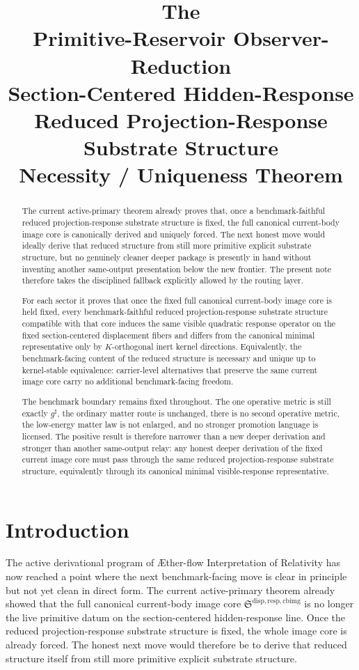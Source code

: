 \documentclass[11pt]{article}
\title{\textbf{The \TheoryName{}}\\[0.4em]
\large Primitive-Reservoir Observer-Reduction\\
\large Section-Centered Hidden-Response\\
\large Reduced Projection-Response Substrate Structure\\
\large Necessity / Uniqueness Theorem}
\author{}
\date{}
\newcommand{\Aflow}{\AE{}ther-flow}
\newcommand{\TheoryName}{\Aflow{} Interpretation of Relativity}
\newcommand{\CompletedMetric}{g^{\sharp}}
\newcommand{\CurrentBodyImageCore}{\mathfrak S^{\mathrm{disp,resp,cbimg}}}
\begin{document}
\maketitle

\begin{abstract}
The current active-primary theorem already proves that, once a benchmark-faithful reduced projection-response substrate structure is fixed, the full canonical current-body image core is canonically derived and uniquely forced. The next honest move would ideally derive that reduced structure from still more primitive explicit substrate structure, but no genuinely cleaner deeper package is presently in hand without inventing another same-output presentation below the new frontier. The present note therefore takes the disciplined fallback explicitly allowed by the routing layer.

For each sector it proves that once the fixed full canonical current-body image core is held fixed, every benchmark-faithful reduced projection-response substrate structure compatible with that core induces the same visible quadratic response operator on the fixed section-centered displacement fibers and differs from the canonical minimal representative only by \(K\)-orthogonal inert kernel directions. Equivalently, the benchmark-facing content of the reduced structure is necessary and unique up to kernel-stable equivalence: carrier-level alternatives that preserve the same current image core carry no additional benchmark-facing freedom.

The benchmark boundary remains fixed throughout. The one operative metric is still exactly \(\CompletedMetric\), the ordinary matter route is unchanged, there is no second operative metric, the low-energy matter law is not enlarged, and no stronger promotion language is licensed. The positive result is therefore narrower than a new deeper derivation and stronger than another same-output relay: any honest deeper derivation of the fixed current image core must pass through the same reduced projection-response substrate structure, equivalently through its canonical minimal visible-response representative.
\end{abstract}

\section{Introduction}

The active derivational program of \TheoryName{} has now reached a point where the next benchmark-facing move is clear in principle but not yet clean in direct form. The current active-primary theorem already showed that the full canonical current-body image core \(\CurrentBodyImageCore\) is no longer the live primitive datum on the section-centered hidden-response line. Once the reduced projection-response substrate structure is fixed, the whole image core is already forced. The honest next move would therefore be to derive that reduced structure itself from still more primitive explicit substrate structure.
\end{document}
